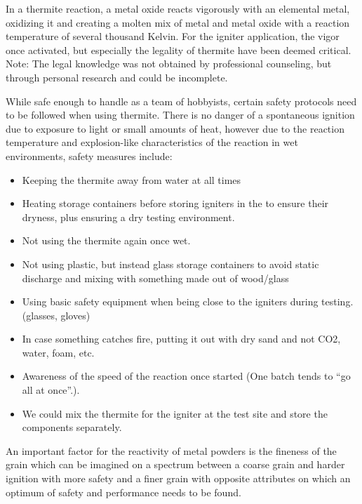         In a thermite reaction, a metal oxide reacts vigorously with an elemental metal, oxidizing it and creating a molten mix of metal and metal oxide with a reaction temperature of several thousand Kelvin. For the igniter application, the vigor once activated, but especially the legality of thermite have been deemed critical. Note: The legal knowledge was not obtained by professional counseling, but through personal research and could be incomplete.
        
        \par    
        While safe enough to handle as a team of hobbyists, certain safety protocols need to be followed when using thermite. 
        There is no danger of a spontaneous ignition due to exposure to light or small amounts of heat, however due to the reaction temperature and explosion-like characteristics of the reaction in wet environments, safety measures include:
        \begin{itemize}
            \item Keeping the thermite away from water at all times
            \item Heating storage containers before storing igniters in the to ensure their dryness, plus ensuring a dry testing environment.
            \item Not using the thermite again once wet.
            \item Not using plastic, but instead glass storage containers to avoid static discharge and mixing with something made out of wood/glass
            \item Using basic safety equipment when being close to the igniters during testing. (glasses, gloves)
            \item In case something catches fire, putting it out with dry sand and not CO2, water, foam, etc.
            \item Awareness of the speed of the reaction once started (One batch tends to “go all at once”.).
            \item We could mix the thermite for the igniter at the test site and store the components separately.
        \end{itemize}
        An important factor for the reactivity of metal powders is the fineness of the grain which can be imagined on a spectrum between a coarse grain and harder ignition with more safety and a finer grain with opposite attributes on which an optimum of safety and performance needs to be found. \par

